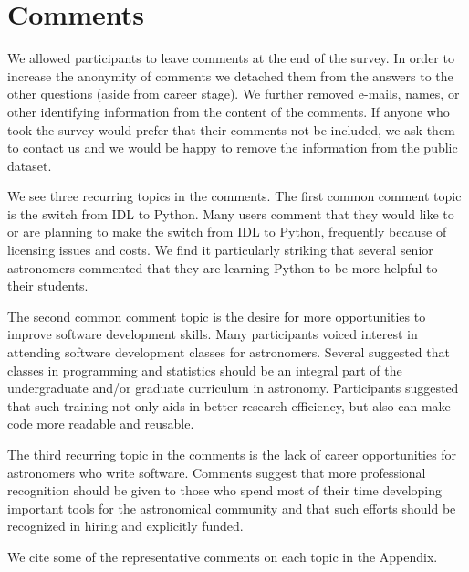 \section{Comments}
\label{sec:comments}

We allowed participants to leave comments at the end of the survey. In order to increase the anonymity of comments we detached them from the answers to the other questions (aside from career stage). We further removed e-mails, names, or other identifying information from the content of the comments. If anyone who took the survey would prefer that their comments not be included, we ask them to contact us and we would be happy to remove the information from the public dataset. 

We see three recurring topics in the comments. The first common comment topic is the switch from IDL to Python. Many users comment that they would like to or are planning to make the switch from IDL to Python, frequently because of licensing issues and costs. We find it particularly striking that several senior astronomers commented that they are learning Python to be more helpful to their students.

The second common comment topic is the desire for more opportunities to improve software development skills. Many participants voiced interest in attending software development classes for astronomers. Several suggested that classes in programming and statistics should be an integral part of the undergraduate and/or graduate curriculum in astronomy. Participants suggested that such training not only aids in better research efficiency, but also can make code more readable and reusable. 

The third recurring topic in the comments is the lack of career opportunities for astronomers who write software. Comments suggest that more professional recognition should be given to those who spend most of their time developing important tools for the astronomical community and that such efforts should be recognized in hiring and explicitly funded. 

We cite some of the representative comments on each topic in the Appendix.

    
  
  